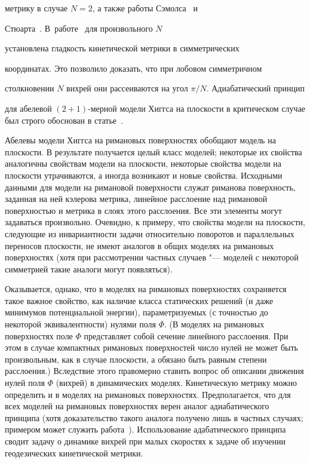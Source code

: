 метрику в случае $N=2$, а также работы Сэмолса~\cite{palv:sam} и

Стюарта~\cite{palv:st}. В~работе~\cite{palv:palvelev1} для произвольного $N$

установлена гладкость кинетической метрики в симметрических

координатах. Это позволило доказать, что при лобовом симметричном

столкновении $N$ вихрей они рассеиваются на угол $\pi/N$. Адиабатический принцип

для абелевой $(2+1)$-мерной модели Хиггса на плоскости в критическом случае был строго обоснован в статье~\cite{palv:palvelev_sergeev}. 



Абелевы модели Хиггса на римановых поверхностях обобщают модель на плоскости. В результате получается целый класс моделей; некоторые их свойства аналогичны свойствам модели на плоскости, некоторые свойства модели на плоскости утрачиваются,  а иногда возникают и новые свойства.  Исходными данными для модели на римановой поверхности служат риманова поверхность, заданная на ней кэлерова метрика, линейное расслоение над римановой поверхностью и метрика в слоях этого расслоения. Все эти элементы могут задаваться произвольно. Очевидно, к примеру, что свойства модели на плоскости, следующие из инвариантности задачи относительно поворотов и параллельных переносов плоскости, не имеют аналогов в общих моделях на римановых поверхностях (хотя при рассмотрении частных случаев "---  моделей с некоторой симметрией такие аналоги могут появляться). 



Оказывается, однако, что в моделях на римановых поверхностях сохраняется такое важное свойство, как наличие класса статических решений (и даже минимумов потенциальной энергии), параметризуемых (с точностью до некоторой эквивалентности) нулями поля $\Phi$. (В моделях на римановых поверхностях поле $\Phi$ представляет собой сечение линейного расслоения. При этом в случае компактных римановых поверхностей число нулей не может быть произвольным, как в случае плоскости, а обязано быть равным степени расслоения.) Вследствие этого правомерно ставить вопрос об описании движения нулей поля $\Phi$ (вихрей) в динамических моделях. Кинетическую метрику можно определить и в моделях на римановых поверхностях. Предполагается, что для всех моделей на римановых поверхностях верен аналог адиабатического принципа  (хотя доказательство такого аналога получено лишь в частных случаях; примером может служить работа~\cite{palv:st2}). Использование адабатического принципа сводит задачу о динамике вихрей при малых скоростях к задаче об изучении геодезических кинетической метрики. 



